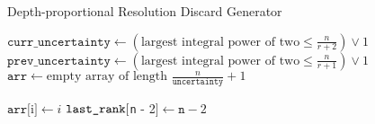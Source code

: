 \begin{algorithm}
\caption{Depth-proportional Resolution Discard Generator}
\label{alg:depth-proportional-resolution-algo-gen-drop-ranks}
\begin{algorithmic}[1]

    \State $\texttt{curr\_uncertainty} \gets (\text{largest integral power of two} \le \frac{n}{r + 2}) \lor 1$
    \State $\texttt{prev\_uncertainty} \gets (\text{largest integral power of two} \le \frac{n}{r + 1}) \lor 1$
    \State $\texttt{arr} \gets \text{empty array of length } \frac{n}{\texttt{uncertainty}} + 1$

            \State $\texttt{arr} [$i$] \gets i$
    \EndFor
        \State $\texttt{\texttt{last\_rank}} [$\texttt{n} - 2$] \gets \texttt{n} - 2$
    \EndIf
\end{algorithmic}
\end{algorithm}
